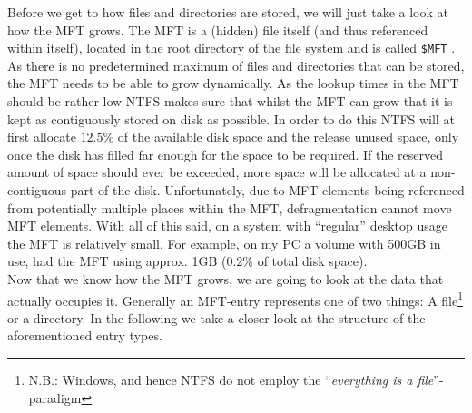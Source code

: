  Before we get to how files and directories are stored, we will just take a look at how the MFT grows. The MFT is a (hidden) file itself (and thus referenced within itself), located in the root directory of the file system and is called \texttt{\$MFT} \cite{RUSSINOVICH_ET_AL:2012:WI}. As there is no predetermined maximum of files and directories that can be stored, the MFT needs to be able to grow dynamically. As the lookup times in the MFT should be rather low NTFS makes sure that whilst the MFT can grow that it is kept as contiguously stored on disk as possible. In order to do this NTFS will at first allocate $12.5\%$ of the available disk space and the release unused space, only once the disk has filled far enough for the space to be required. If the reserved amount of space should ever be exceeded, more space will be allocated at a non-contiguous part of the disk. Unfortunately, due to MFT elements being referenced from potentially multiple places within the MFT, defragmentation cannot move MFT elements\cite{microsoftinc:2018:HNR}. With all of this said, on a system with ``regular'' desktop usage the MFT is relatively small. For example, on my PC a volume with 500GB in use, had the MFT using approx. 1GB ($0.2$\% of total disk space).\\  Now that we know how the MFT grows, we are going to look at the data that actually occupies it. Generally an MFT-entry represents one of two things: A file\footnote{N.B.: Windows, and hence NTFS do not employ the ``\textit{everything is a file}''-paradigm} or a directory. In the following we take a closer look at the structure of the aforementioned entry types.\\
